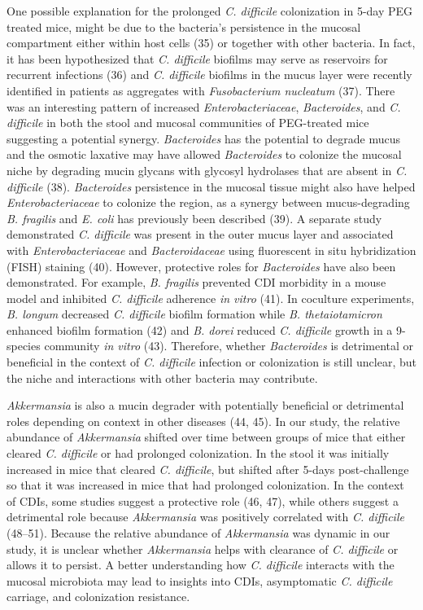 \documentclass[
  11pt,
]{article}
\begin{document}
One possible explanation for the prolonged \emph{C. difficile}
colonization in 5-day PEG treated mice, might be due to the bacteria's
persistence in the mucosal compartment either within host cells (35) or
together with other bacteria. In fact, it has been hypothesized that
\emph{C. difficile} biofilms may serve as reservoirs for recurrent
infections (36) and \emph{C. difficile} biofilms in the mucus layer were
recently identified in patients as aggregates with \emph{Fusobacterium
nucleatum} (37). There was an interesting pattern of increased
\emph{Enterobacteriaceae}, \emph{Bacteroides}, and \emph{C. difficile}
in both the stool and mucosal communities of PEG-treated mice suggesting
a potential synergy. \emph{Bacteroides} has the potential to degrade
mucus and the osmotic laxative may have allowed \emph{Bacteroides} to
colonize the mucosal niche by degrading mucin glycans with glycosyl
hydrolases that are absent in \emph{C. difficile} (38).
\emph{Bacteroides} persistence in the mucosal tissue might also have
helped \emph{Enterobacteriaceae} to colonize the region, as a synergy
between mucus-degrading \emph{B. fragilis} and \emph{E. coli} has
previously been described (39). A separate study demonstrated \emph{C.
difficile} was present in the outer mucus layer and associated with
\emph{Enterobacteriaceae} and \emph{Bacteroidaceae} using fluorescent in
situ hybridization (FISH) staining (40). However, protective roles for
\emph{Bacteroides} have also been demonstrated. For example, \emph{B.
fragilis} prevented CDI morbidity in a mouse model and inhibited
\emph{C. difficile} adherence \emph{in vitro} (41). In coculture
experiments, \emph{B. longum} decreased \emph{C. difficile} biofilm
formation while \emph{B. thetaiotamicron} enhanced biofilm formation
(42) and \emph{B. dorei} reduced \emph{C. difficile} growth in a
9-species community \emph{in vitro} (43). Therefore, whether
\emph{Bacteroides} is detrimental or beneficial in the context of
\emph{C. difficile} infection or colonization is still unclear, but the
niche and interactions with other bacteria may contribute.

\emph{Akkermansia} is also a mucin degrader with potentially beneficial
or detrimental roles depending on context in other diseases (44, 45). In
our study, the relative abundance of \emph{Akkermansia} shifted over
time between groups of mice that either cleared \emph{C. difficile} or
had prolonged colonization. In the stool it was initially increased in
mice that cleared \emph{C. difficile}, but shifted after 5-days
post-challenge so that it was increased in mice that had prolonged
colonization. In the context of CDIs, some studies suggest a protective
role (46, 47), while others suggest a detrimental role because
\emph{Akkermansia} was positively correlated with \emph{C. difficile}
(48--51). Because the relative abundance of \emph{Akkermansia} was
dynamic in our study, it is unclear whether \emph{Akkermansia} helps
with clearance of \emph{C. difficile} or allows it to persist. A better
understanding how \emph{C. difficile} interacts with the mucosal
microbiota may lead to insights into CDIs, asymptomatic \emph{C.
difficile} carriage, and colonization resistance.
\end{document}
